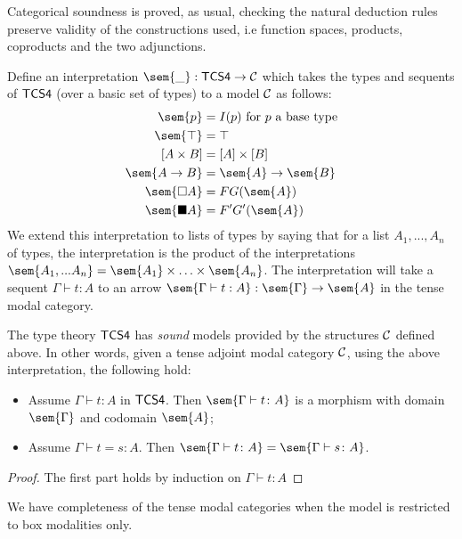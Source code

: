 Categorical soundness is proved, as usual, checking the natural
deduction rules preserve validity of the constructions used, i.e
function spaces, products, coproducts and the two adjunctions.

Define an interpretation $\sem{\_} : \sf{TCS4} \to {\cal C}$ which
takes the types and sequents of $\sf{TCS4}$ (over a basic set of
types) to a model $\cal C$ as follows:
\begin{align*}
\sem{p} &= I(p) \mbox{  for $p$ a base type}\\
\sem{\top} &= \top\\
[A\times B] &= [A]\times [B]\\
\sem{  A \to B  } &=  \sem{ A}  \to  \sem{ B }\\
\sem{\Box A} &= F G(\sem{A})\\
\sem{\blacksquare A} &= F' G'(\sem{A})
\end{align*}
 We extend this interpretation to lists of types by saying that for a
 list $A_1, ..., A_n$ of types, the interpretation is the product of
 the interpretations $\sem{A_1,...A_n} = \sem{A_1} \times \ldots
 \times \sem{A_n}$.  The interpretation will take a sequent $\Gamma
 \vdash t : A$ to an arrow $ \sem {\Gamma \vdash t : A} : \sem{
   \Gamma} \to \sem{A} $ in the tense modal category.

\begin{theorem}
\label{thm:tcs4-csound}
The type theory $\sf{TCS4}$ has \textit{sound} models provided by the
structures $\cal C$ defined above.  In other words, given a tense
adjoint modal category $\cal C$, using the above interpretation, the
following hold:
\begin{itemize}
\item Assume $\Gamma \vdash t : A$ in $\sf{TCS4}$. Then $\sem{\Gamma
  \vdash t \colon A}$ is a morphism with domain $\sem{\Gamma}$ and
  codomain $\sem{A}$;
\item Assume $\Gamma \vdash t = s \colon A$. Then $\sem{\Gamma
  \vdash t \colon A} = \sem{\Gamma \vdash s \colon A}$.
\end{itemize}
\end{theorem}
\begin{proof}
  The first part holds by induction on $\Gamma \vdash t : A$
\end{proof}

We  have completeness of the tense modal categories when the model is restricted to box modalities only.

